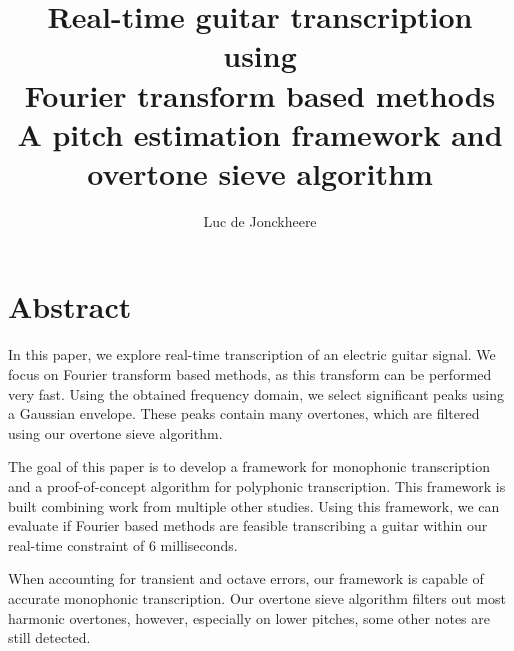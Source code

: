 \documentclass[10pt,twocolumn]{article}
\title{\textbf{Real-time guitar transcription using\\Fourier transform based methods}\\A pitch estimation framework and overtone sieve algorithm}
\author{Luc de Jonckheere}
\begin{document}

\maketitle


\section*{Abstract}
In this paper, we explore real-time transcription of an electric guitar signal. We focus on Fourier transform based methods, as this transform can be performed very fast. Using the obtained frequency domain, we select significant peaks using a Gaussian envelope. These peaks contain many overtones, which are filtered using our overtone sieve algorithm.

The goal of this paper is to develop a framework for monophonic transcription and a proof-of-concept algorithm for polyphonic transcription. This framework is built combining work from multiple other studies. Using this framework, we can evaluate if Fourier based methods are feasible transcribing a guitar within our real-time constraint of 6 milliseconds.

When accounting for transient and octave errors, our framework is capable of accurate monophonic transcription. Our overtone sieve algorithm filters out most harmonic overtones, however, especially on lower pitches, some other notes are still detected.

\end{document}
